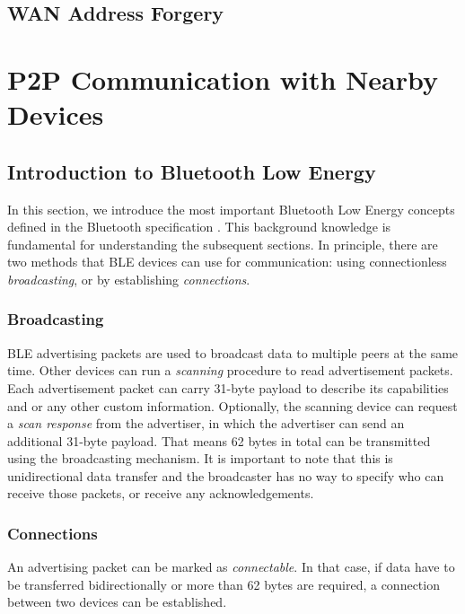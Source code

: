 \subsection{WAN Address Forgery}

\clearpage

\section{P2P Communication with Nearby Devices}

\subsection{Introduction to Bluetooth Low Energy}

In this section, we introduce the most important Bluetooth Low Energy concepts defined in the Bluetooth specification \cite{bluetooth51spec}. This background knowledge is fundamental for understanding the subsequent sections. In principle, there are two methods that BLE devices can use for communication: using connectionless \textit{broadcasting}, or by establishing \textit{connections}.

\subsubsection{Broadcasting}

BLE advertising packets are used to broadcast data to multiple peers at the same time. Other devices can run a \textit{scanning} procedure to read advertisement packets. Each advertisement packet can carry 31-byte payload to describe its capabilities and or any other custom information. Optionally, the scanning device can request a \textit{scan response} from the advertiser, in which the advertiser can send an additional 31-byte payload. That means 62 bytes in total can be transmitted using the broadcasting mechanism. It is important to note that this is unidirectional data transfer and the broadcaster has no way to specify who can receive those packets, or receive any acknowledgements.

\subsubsection{Connections}

An advertising packet can be marked as \textit{connectable}. In that case, if data have to be transferred bidirectionally or more than 62 bytes are required, a connection between two devices can be established.

